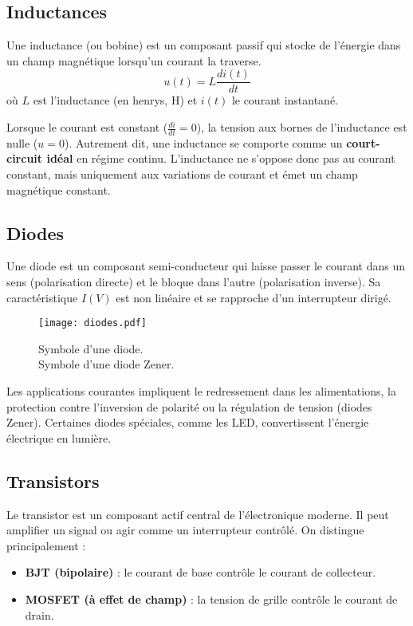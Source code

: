 \subsection{Inductances} \label{subsec:inductors}
Une inductance (ou bobine) est un composant passif qui stocke de l’\'energie
dans un champ magn\'etique lorsqu’un courant la traverse.
\[
u(t) = L \frac{di(t)}{dt}
\]
où \(L\) est l’inductance (en henrys, \unit{\henry}) et \(i(t)\) le courant instantan\'e.

\vspace{\baselineskip}
Lorsque le courant est constant (\(\frac{di}{dt} = 0\)), la tension aux bornes
de l’inductance est nulle (\(u = 0\)). Autrement dit, une inductance se comporte
comme un \textbf{court-circuit id\'eal} en r\'egime continu. L’inductance ne s’oppose
donc pas au courant constant, mais uniquement aux variations de courant et \'emet un champ
magn\'etique constant.


\subsection{Diodes} \label{subsec:diodes}
Une diode est un composant semi-conducteur qui laisse passer le courant
dans un sens (polarisation directe) et le bloque dans l’autre (polarisation inverse).
Sa caract\'eristique \(I(V)\) est non lin\'eaire et se rapproche
d’un interrupteur dirig\'e.
\begin{figure}[H]
    \centering
    \texttt{[image: diodes.pdf]}
    \caption{\newline
         Symbole d’une diode.\\
         Symbole d’une diode Zener.
    }
\end{figure}
Les applications courantes impliquent le redressement dans les alimentations, la protection contre l’inversion de polarit\'e
ou la r\'egulation de tension (diodes Zener).
Certaines diodes sp\'eciales, comme les LED, convertissent l’\'energie \'electrique en lumi\`ere.

\subsection{Transistors} \label{subsec:transistors}
Le transistor est un composant actif central de l’\'electronique moderne.
Il peut amplifier un signal ou agir comme un interrupteur contrôl\'e.
On distingue principalement :
\begin{itemize}
  \item \textbf{BJT (bipolaire)} : le courant de base contrôle
  le courant de collecteur.
  \item \textbf{MOSFET (à effet de champ)} : la tension de grille contrôle
  le courant de drain.
\end{itemize}

